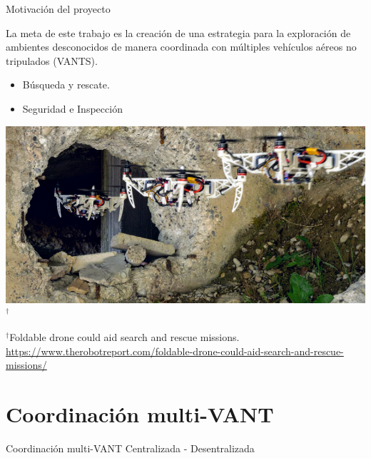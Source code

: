\documentclass[
  24pt, %
  aspectratio=169, %
]{beamer}
\begin{document}

\begin{frame}{Motivación del proyecto}
  \begin{minipage}{0.47\textwidth}

    \small La meta de este trabajo es la creación de una estrategia para la exploración de ambientes desconocidos de manera coordinada con múltiples vehículos aéreos no tripulados (VANTS).
    \bigskip %
    \begin{itemize}
    \item Búsqueda y rescate.
    \item Seguridad e Inspección
    \end{itemize}
  \end{minipage}
  \hspace{0.2cm}
  \begin{minipage}{0.5\textwidth}
    \includegraphics[width=\textwidth]{foldable-drone}$^\dag$\\
      \rule{0in}{1.2em}$^\dag$\scriptsize Foldable drone could aid search and rescue missions.\\
      \tiny \url{https://www.therobotreport.com/foldable-drone-could-aid-search-and-rescue-missions/} 
  \end{minipage}
\end{frame}

\section{Coordinación multi-VANT}
\begin{frame}{Coordinación multi-VANT}
Centralizada - Desentralizada
\end{frame}
\end{document}
